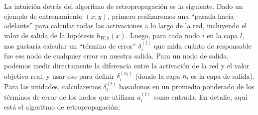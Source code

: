 La intuición detrás del algoritmo de retropropagación es la siguiente. Dado un ejemplo de entrenamiento $(x, y)$, primero realizaremos una ``pasada hacia adelante'' para calcular todas las activaciones a lo largo de la red, incluyendo el valor de salida de la hipótesis $h_{W,b}(x)$. Luego, para cada nodo $i$ en la capa $l$, nos gustaría calcular un ``término de error'' $\delta^{(l)}_i$ que mida cuánto de responsable fue ese nodo de cualquier error en nuestra salida. Para un nodo de salida, podemos medir directamente la diferencia entre la activación de la red y el valor objetivo real, y usar eso para definir $\delta^{(n_l)}_i$ (donde la capa $n_l$ es la capa de salida). Para las unidades, calcularemos $\delta^{(l)}_i$ basadonos en un promedio ponderado de los términos de error de los nodos que utilizan $a^{(l)}_i$ como entrada. En detalle, aquí está el algoritmo de retropropagación:
